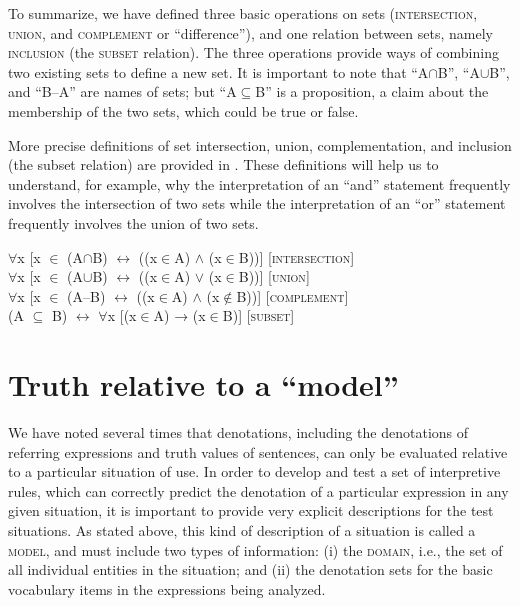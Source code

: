 To summarize, we have defined three basic operations on sets (\textsc{intersection}, \textsc{union}, and \textsc{complement} or “difference”), and one relation between sets, namely \textsc{inclusion} (the \textsc{subset} relation). The three operations provide ways of combining two existing sets to define a new set. It is important to note that “A${\cap}$B”, “A${\cup}$B”, and “B–A” are names of sets; but “A${\subseteq}$B” is a proposition, a claim about the membership of the two sets, which could be true or false.



More precise definitions of set intersection, union, complementation, and inclusion (the subset relation) are provided in . These definitions will help us to understand, for example, why the interpretation of an “and” statement frequently involves the intersection of two sets while the interpretation of an “or” statement frequently involves the union of two sets.


\ea
${\forall}$x [x ${\in}$ (A${\cap}$B)  $\leftrightarrow $  ((x${\in}$A) $\wedge$ (x${\in}$B))]  [\textsc{intersection}]\\
${\forall}$x [x ${\in}$ (A${\cup}$B)  $\leftrightarrow $  ((x${\in}$A) $\vee$ (x${\in}$B))]  [\textsc{union}]\\
${\forall}$x [x ${\in}$ (A–B)  $\leftrightarrow $  ((x${\in}$A) $\wedge$ (x${\notin}$B))]  [\textsc{complement}]\\
(A ${\subseteq}$ B)  $\leftrightarrow $  ${\forall}$x [(x${\in}$A) → (x${\in}$B)]  [\textsc{subset}]
\z

\section{Truth relative to a “model”}\label{sec:13.4}

We have noted several times that denotations, including the denotations of referring expressions and truth values of sentences, can only be evaluated relative to a particular situation of use. In order to develop and test a set of interpretive rules, which can correctly predict the denotation of a particular expression in any given situation, it is important to provide very explicit descriptions for the test situations. As stated above, this kind of description of a situation is called a \textsc{model}, and must include two types of information: (i) the \textsc{domain}, i.e., the set of all individual entities in the situation; and (ii) the denotation sets for the basic vocabulary items in the expressions being analyzed.



